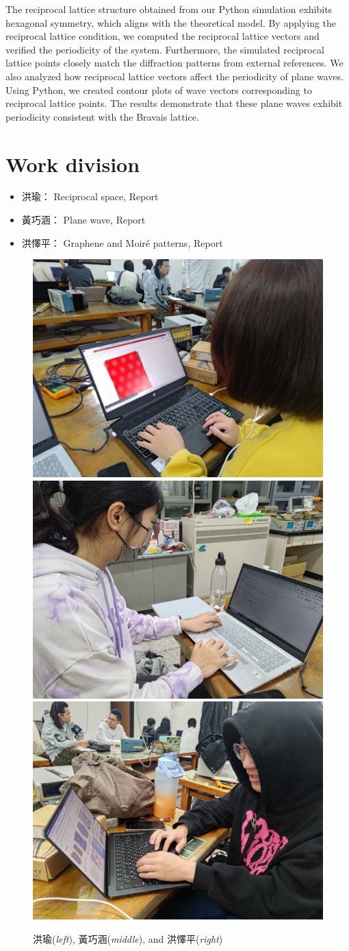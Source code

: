 \documentclass[12pt,a4paper]{article}
\begin{document}
\begin{CJK}{UTF8}{bkai}
The reciprocal lattice structure obtained from our Python simulation exhibits hexagonal symmetry, which aligns with the theoretical model. By applying the reciprocal lattice condition, we computed the reciprocal lattice vectors and verified the periodicity of the system. Furthermore, the simulated reciprocal lattice points closely match the diffraction patterns from external references. We also analyzed how reciprocal lattice vectors affect the periodicity of plane waves. Using Python, we created contour plots of wave vectors corresponding to reciprocal lattice points. The results demonstrate that these plane waves exhibit periodicity consistent with the Bravais lattice.


\section{Work division}\label{sec:work}

\begin{itemize}
    \item 洪瑜： Reciprocal space, Report
    \item 黃巧涵： Plane wave, Report
    \item 洪懌平： Graphene and Moiré patterns, Report
\end{itemize}

\begin{figure}[h]
    \centering
    \includegraphics[width=0.30\linewidth]{figures/hyu.jpg}
    \includegraphics[width=0.30\linewidth]{figures/hch.jpg}
    \includegraphics[width=0.30\linewidth]{figures/hyp.jpg}
    \caption{洪瑜(\textit{left}), 黃巧涵(\textit{middle}), and 洪懌平(\textit{right})}
    \label{fig:work}
\end{figure}


\end{CJK}
\end{document}
